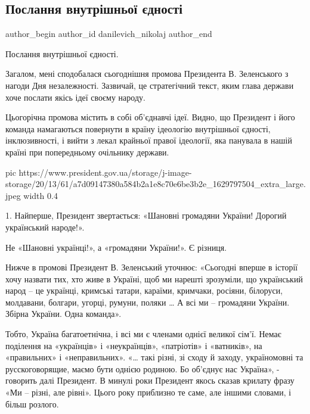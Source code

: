  
 
 
 
 
 
\subsection{Послання внутрішньої єдності}
\label{sec:24_08_2021.fb.danilevich_nikolaj.1.jednist_poslannja}
 
\ifcmt
 author_begin
   author_id danilevich_nikolaj
 author_end
\fi

Послання внутрішньої єдності.

Загалом, мені сподобалася сьогоднішня промова Президента В. Зеленського з
нагоди Дня незалежності. Зазвичай, це стратегічний текст, яким глава держави
хоче послати якісь ідеї своєму народу.  

Цьогорічна промова містить в собі об’єднавчі ідеї. Видно, що Президент і його
команда намагаються повернути в країну ідеологію внутрішньої єдності,
інклюзивності, і вийти з лекал крайньої правої ідеології, яка панувала в нашій
країні при попередньому очільнику держави. 

\ifcmt
  pic https://www.president.gov.ua/storage/j-image-storage/20/13/61/a7d09147380a584b2a1e8c70e6be3b2e_1629797504_extra_large.jpeg
  width 0.4
\fi

1. Найперше, Президент звертається: «Шановні громадяни України! Дорогий український народе!».

Не «Шановні українці!», а «громадяни України!». Є різниця.  

Нижче в промові Президент В. Зеленський уточнює: «Сьогодні вперше в історії
хочу назвати тих, хто живе в Україні, щоб ми нарешті зрозуміли, що український
народ – це українці, кримські татари, караїми, кримчаки, росіяни, білоруси,
молдавани, болгари, угорці, румуни, поляки … А всі ми – громадяни України.
Збірна України. Одна команда». 

Тобто, Україна багатоетнічна, і всі ми є членами однієї великої сім’ї. Немає
поділення на «українців» і «неукраїнців», «патріотів» і «ватників», на
«правильних» і «неправильних». «… такі різні, зі сходу й заходу, україномовні
та русскоговорящие, маємо бути однією родиною. Бо об'єднує нас Україна», -
говорить далі Президент. В минулі роки Президент якось сказав крилату фразу «Ми
– різні, але рівні». Цього року приблизно те саме, але іншими словами, і більш
розлого. 

